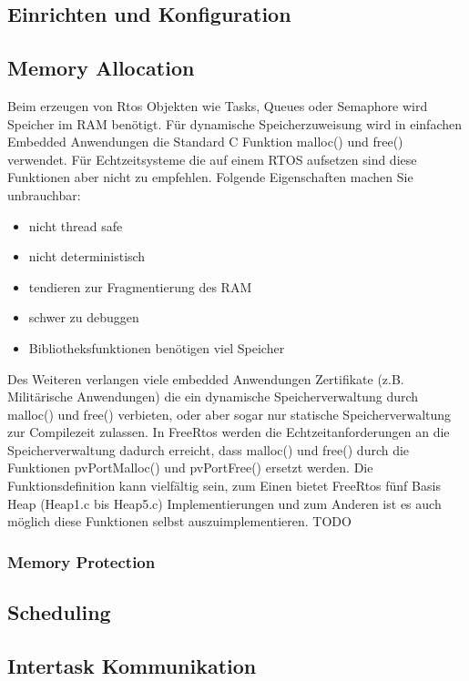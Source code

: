 \documentclass[ngerman]{seminarvorlage}
\begin{document}
\subsection{Einrichten und Konfiguration}
\label{sec:Einrichtung und Konfiguration}
\subsection{Memory Allocation}
Beim erzeugen von Rtos Objekten wie Tasks, Queues oder Semaphore wird Speicher im RAM benötigt. Für dynamische Speicherzuweisung wird in einfachen Embedded Anwendungen die Standard C Funktion malloc() und free() verwendet. Für Echtzeitsysteme die auf einem RTOS aufsetzen sind diese Funktionen aber nicht zu empfehlen. Folgende Eigenschaften\cite{MasteringFreeRtos} machen Sie unbrauchbar:
\begin{itemize}
	\item nicht thread safe
	\item nicht deterministisch
	\item tendieren zur Fragmentierung des RAM
	\item schwer zu debuggen
	\item Bibliotheksfunktionen benötigen viel Speicher
\end{itemize}
Des Weiteren verlangen viele embedded Anwendungen Zertifikate (z.B. Militärische Anwendungen) die ein dynamische Speicherverwaltung durch malloc() und free() verbieten, oder aber sogar nur statische Speicherverwaltung zur Compilezeit zulassen. In FreeRtos werden die Echtzeitanforderungen an die Speicherverwaltung dadurch erreicht, dass malloc() und free() durch die Funktionen pvPortMalloc() und pvPortFree() ersetzt werden. Die Funktionsdefinition kann vielfältig sein, zum Einen bietet FreeRtos fünf Basis Heap (Heap1.c bis Heap5.c) Implementierungen und zum Anderen ist es auch möglich diese Funktionen selbst auszuimplementieren. TODO    

\subsubsection{Memory Protection}
\subsection{Scheduling}

\subsection{Intertask Kommunikation}
\end{document}
